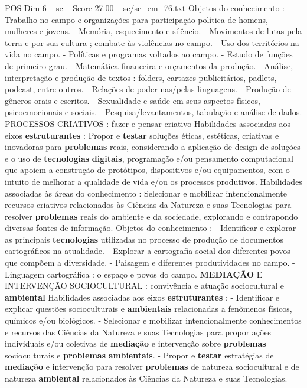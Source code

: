 \begin{textsample}{POS Dim 6 – sc – Score 27.00 – sc/sc\_em\_76.txt}
Objetos do conhecimento : - Trabalho no campo e organizações para participação política de homens, mulheres e jovens. - Memória, esquecimento e silêncio. - Movimentos de lutas pela terra e por sua cultura ; combate às violências no campo. - Uso dos territórios na vida no campo. - Políticas e programas voltados ao campo. - Estudo de funções de primeiro grau. - Matemática financeira e orçamentos da produção. - Análise, interpretação e produção de textos : folders, cartazes publicitários, padlets, podcast, entre outros. - Relações de poder nas/pelas linguagens. - Produção de gêneros orais e escritos. - Sexualidade e saúde em seus aspectos físicos, psicoemocionais e sociais. - Pesquisa/levantamentos, tabulação e análise de dados.
PROCESSOS CRIATIVOS : fazer e pensar criativo Habilidades associadas aos eixos \textbf{estruturantes} : Propor e \textbf{testar} soluções éticas, estéticas, criativas e inovadoras para \textbf{problemas} reais, considerando a aplicação de design de soluções e o uso de \textbf{tecnologias} \textbf{digitais}, programação e/ou pensamento computacional que apoiem a construção de protótipos, dispositivos e/ou equipamentos, com o intuito de melhorar a qualidade de vida e/ou os processos produtivos.
Habilidades associadas às áreas do conhecimento : Selecionar e mobilizar intencionalmente recursos criativos relacionados às Ciências da Natureza e suas Tecnologias para resolver \textbf{problemas} reais do ambiente e da sociedade, explorando e contrapondo diversas fontes de informação.
Objetos do conhecimento : - Identificar e explorar as principais \textbf{tecnologias} utilizadas no processo de produção de documentos cartográficos na atualidade. - Explorar a cartografia social dos diferentes povos que compõem a diversidade. - Paisagem e diferentes produtividades no campo. - Linguagem cartográfica : o espaço e povos do campo. \textbf{MEDIAÇÃO} E INTERVENÇÃO SOCIOCULTURAL : convivência e atuação sociocultural e \textbf{ambiental} Habilidades associadas aos eixos \textbf{estruturantes} : - Identificar e explicar questões socioculturais e \textbf{ambientais} relacionadas a fenômenos físicos, químicos e/ou biológicos. - Selecionar e mobilizar intencionalmente conhecimentos e recursos das Ciências da Natureza e suas Tecnologias para propor ações individuais e/ou coletivas de \textbf{mediação} e intervenção sobre \textbf{problemas} socioculturais e \textbf{problemas} \textbf{ambientais}. - Propor e \textbf{testar} estratégias de \textbf{mediação} e intervenção para resolver \textbf{problemas} de natureza sociocultural e de natureza \textbf{ambiental} relacionados às Ciências da Natureza e suas Tecnologias.

\end{textsample}
